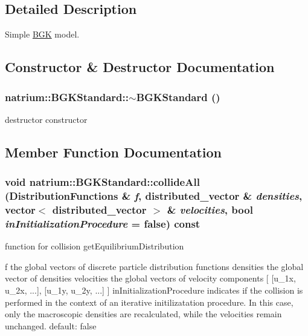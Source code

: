 \subsection{Detailed Description}
Simple \hyperlink{classnatrium_1_1BGK}{BGK} model. 

\subsection{Constructor \& Destructor Documentation}
\hypertarget{classnatrium_1_1BGKStandard_aa55035be79098a762cf4f0ef308d41e5}{
\subsubsection[{$\sim$BGKStandard}]{\setlength{\rightskip}{0pt plus 5cm}natrium::BGKStandard::$\sim$BGKStandard ()}}
\label{classnatrium_1_1BGKStandard_aa55035be79098a762cf4f0ef308d41e5}


destructor constructor 

\subsection{Member Function Documentation}
\hypertarget{classnatrium_1_1BGKStandard_a58ffede8b7587e584875ab8e4279fcac}{
\subsubsection[{collideAll}]{\setlength{\rightskip}{0pt plus 5cm}void natrium::BGKStandard::collideAll ({\bf DistributionFunctions} \& {\em f}, \/  distributed\_\-vector \& {\em densities}, \/  vector$<$ distributed\_\-vector $>$ \& {\em velocities}, \/  bool {\em inInitializationProcedure} = {\ttfamily false}) const}}
\label{classnatrium_1_1BGKStandard_a58ffede8b7587e584875ab8e4279fcac}


function for collision getEquilibriumDistribution

f the global vectors of discrete particle distribution functions densities the global vector of densities velocities the global vectors of velocity components \mbox{[} \mbox{[}u\_\-1x, u\_\-2x, ...\mbox{]}, \mbox{[}u\_\-1y, u\_\-2y, ...\mbox{]} \mbox{]} inInitializationProcedure indicates if the collision is performed in the context of an iterative initilizatation procedure. In this case, only the macroscopic densities are recalculated, while the velocities remain unchanged. default: false 

